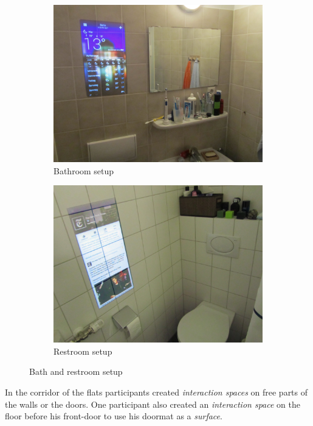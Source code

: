 \begin{figure}[htbp]
        \centering
        \begin{subfigure}[b]{0.48\textwidth}
                \includegraphics[width=\textwidth]{images/interview/bath.jpg}
                \caption{Bathroom setup}
                \label{img:bath}
        \end{subfigure}   
\hfill
        \begin{subfigure}[b]{0.48\textwidth}
                \includegraphics[width=\textwidth]{images/interview/bath02.jpg}
                \caption{Restroom setup}
                \label{img:bath01}
        \end{subfigure}
       \caption{Bath and restroom setup}\label{img:bath}
\end{figure}
In the corridor of the flats participants created \emph{interaction spaces} on free parts of the walls or the doors. One participant also created an \emph{interaction space} on the floor before his front-door to use his doormat as a \emph{surface}. 

